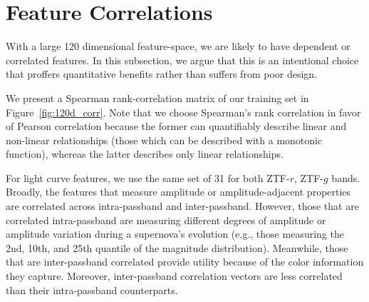 \documentclass[twocolumn]{aastex63}
\begin{document}





\section{Feature Correlations}
\label{subsec:APP_feat_corr}

\renewcommand{\thefigure}{C.\arabic{figure}}
\setcounter{figure}{0}
\renewcommand{\thetable}{C.\arabic{table}} \setcounter{table}{0}

With a large 120 dimensional feature-space, we are likely to have dependent or correlated features. In this subsection, we argue that this is an intentional choice that proffers quantitative benefits rather than suffers from poor design. \par

We present a Spearman rank-correlation matrix of our training set in Figure~\ref{fig:120d_corr}. Note that we choose Spearman's rank correlation in favor of Pearson correlation because the former can quantifiably describe linear and non-linear relationships (those which can be described with a monotonic function), whereas the latter describes only linear relationships. \par

For light curve features, we use the same set of 31 for both ZTF-$r$, ZTF-$g$ bands. Broadly, the features that measure amplitude or amplitude-adjacent properties are correlated across intra-passband and inter-passband. However, those that are correlated intra-passband are measuring different degrees of amplitude or amplitude variation during a supernova's evolution (e.g., those measuring the 2nd, 10th, and 25th quantile of the magnitude distribution). Meanwhile, those that are inter-passband correlated provide utility because of the color information they capture. Moreover, inter-passband correlation vectors are less correlated than their intra-passband counterparts. \par
\end{document}
